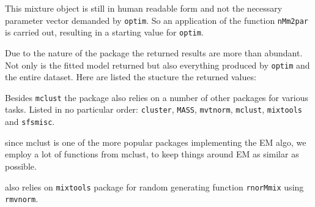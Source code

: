 This mixture object is still in human readable form and not the necessary 
parameter vector demanded by {\tt optim}. So an application of the function
{\tt nMm2par} is carried out, resulting in a starting value for {\tt optim}.


Due to the nature of the package the returned results are more than abundant.
Not only is the fitted model returned but also everything produced by 
{\tt optim} and the entire dataset. Here are listed the stucture the returned 
values:

\begin{Schunk}
\end{Schunk}


Besides {\tt mclust} the package also relies on a number of other packages for 
various tasks. Listed in no particular order: {\tt cluster}, {\tt MASS}, 
{\tt mvtnorm}, {\tt mclust}, {\tt mixtools} and {\tt sfsmisc}.

since mclust is one of the more popular packages implementing the EM algo, we 
employ a lot of functions from mclust, to keep things around EM as similar as 
possible.


also relies on {\tt mixtools} package for random generating function 
{\tt rnorMmix} using {\tt rmvnorm}.


